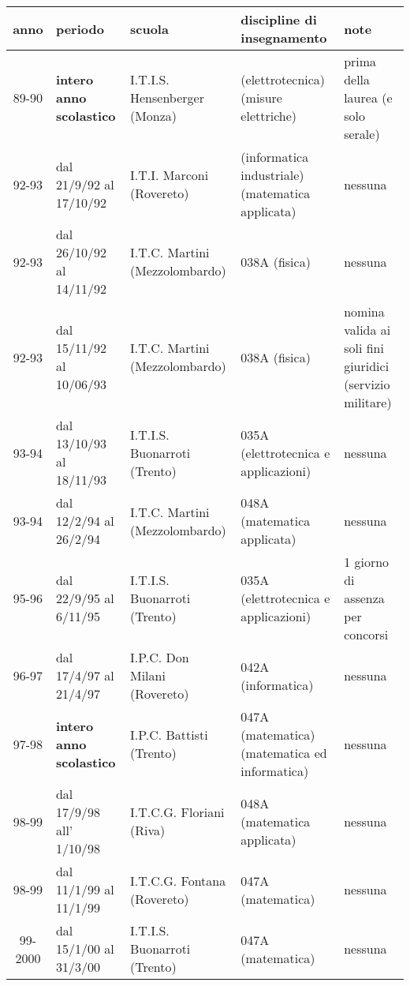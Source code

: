 \documentclass[10pt]{article}
\begin{document}
\begin{center}
\begin{tabular}[c]{||c|p{0.80in}|p{1.25in}|p{1.25in}|p{1.25in}||}
 \hline \hline
  anno      & periodo & scuola & discipline di insegnamento & note\\
 \hline \hline
  89-90     & {\bf intero anno scolastico} & I.T.I.S. Hensenberger (Monza)
            & (elettrotecnica) (misure elettriche)
            & prima della laurea (e solo serale) \\
 \hline \hline
  92-93     & dal 21/9/92 al 17/10/92
            & I.T.I. Marconi (Rovereto)
            & (informatica industriale) %
              (matematica applicata) %
            & nessuna \\
  92-93     & dal 26/10/92 al 14/11/92 & I.T.C. Martini (Mezzolombardo)
            & 038A (fisica) & nessuna \\
  92-93     & dal 15/11/92 al 10/06/93 & I.T.C. Martini (Mezzolombardo)
            & 038A (fisica)
            & nomina valida ai soli fini giuridici (servizio militare) \\
 \hline \hline
  93-94     & dal 13/10/93 al 18/11/93 & I.T.I.S. Buonarroti (Trento)
            & 035A (elettrotecnica e applicazioni) & nessuna \\
  93-94     & dal 12/2/94 al 26/2/94 & I.T.C. Martini (Mezzolombardo)
            & 048A (matematica applicata) & nessuna \\
 \hline \hline
  95-96     & dal 22/9/95 al 6/11/95 & I.T.I.S. Buonarroti (Trento)
            & 035A (elettrotecnica e applicazioni) & 1 giorno di
  assenza per concorsi \\
 \hline \hline
  96-97   & dal 17/4/97 al 21/4/97 & I.P.C. Don Milani (Rovereto)
            & 042A (informatica) & nessuna \\
 \hline \hline
  97-98     & {\bf intero anno scolastico} & I.P.C. Battisti (Trento)
            & 047A (matematica) (matematica ed informatica)
            & nessuna \\
 \hline \hline
  98-99   & dal 17/9/98 all' 1/10/98 & I.T.C.G. Floriani (Riva)
            & 048A (matematica applicata) & nessuna \\
  98-99   & dal 11/1/99 al 11/1/99 & I.T.C.G. Fontana (Rovereto)
            & 047A (matematica) & nessuna \\
 \hline \hline
  99-2000   & dal 15/1/00 al 31/3/00 & I.T.I.S. Buonarroti (Trento)
            & 047A (matematica) & nessuna \\
 \hline \hline
\end{tabular}
\end{center}
\end{document}
